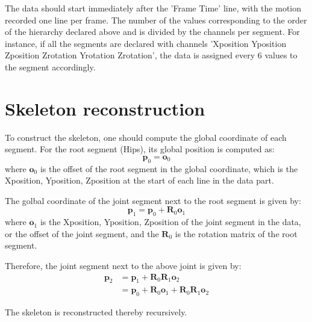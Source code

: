 \documentclass{report}
\begin{document}
The data should start immediately after the 'Frame Time' line, with the motion recorded one line per frame. The number of the values corresponding to the order of the hierarchy declared above and is divided by the channels per segment. For instance, if all the segments are declared with channels 'Xposition Yposition Zposition Zrotation Yrotation Zrotation', the data is assigned every 6 values to the segment accordingly.

\section{Skeleton reconstruction}
To construct the skeleton, one should compute the global coordinate of each segment. For the root segment (Hips), its global position is computed as:
\begin{equation}
\bm{p}_0 = \bm{o}_0
\end{equation}
where $\bm{o}_0$ is the offset of the root segment in the global coordinate, which is the Xposition, Yposition, Zposition at the start of each line in the data part.

The golbal coordinate of the joint segment next to the root segment is given by:
\begin{equation}
\bm{p}_1 = \bm{p}_0+\bm{R}_0\bm{o}_1
\end{equation}
where $\bm{o}_1$ is the Xposition, Yposition, Zposition of the joint segment in the data, or the offset of the joint segment, and the $\bm{R}_0$ is the rotation matrix of the root segment.

Therefore, the joint segment next to the above joint is given by:
\begin{align}
\bm{p}_2 &= \bm{p}_1+\bm{R}_0\bm{R}_1\bm{o}_2\nonumber\\
         &= \bm{p}_0+\bm{R}_0\bm{o}_1+\bm{R}_0\bm{R}_1\bm{o}_2
\end{align}

The skeleton is reconstructed thereby recursively. 
\end{document}
